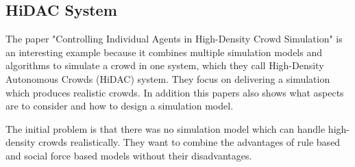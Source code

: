 \documentclass[sigconf]{acmart}
\begin{document}
\subsection{HiDAC System}

The paper "Controlling Individual Agents in High-Density Crowd Simulation" \cite{pelechano_controlling_2007} is an interesting example because it combines multiple simulation models and algorithms to simulate a crowd in one system, which they call High-Density Autonomous Crowds (HiDAC) system. They focus on delivering a simulation which produces realistic crowds.
In addition this papers also shows what aspects are to consider and how to design a simulation model.

The initial problem is that there was no simulation model which can handle high-density crowds realistically. They want to combine the advantages of rule based and social force based models without their disadvantages.
\end{document}
